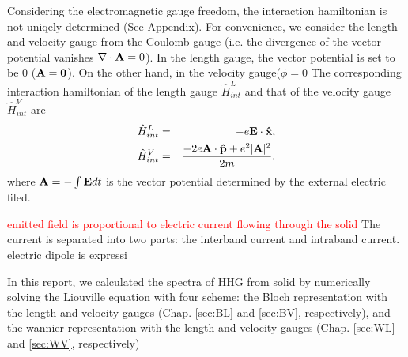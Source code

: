\documentclass[aps,prb,preprint]{revtex4-1}
\begin{document}
Considering the electromagnetic gauge freedom, the interaction hamiltonian is not uniqely determined (See Appendix). For convenience, we consider the length and velocity gauge from the Coulomb gauge (i.e. the divergence of the vector potential vanishes $\nabla \cdot {\bf A} = 0$). In the length gauge, the vector potential is set to be 0 (${\bf A} = {\bf 0}$). On the other hand, in the velocity gauge($\phi = 0$
The corresponding interaction hamiltonian of the length gauge  $\hat{H}^{L}_{int}$ and that of the velocity gauge $\hat{H}^{V}_{int}$ are 
 \begin{eqnarray}
 \hat{H}^{L}_{int} &=&  -e{\bf E} \cdot {\bf \hat{x}}, \\
 \hat{H}^{V}_{int} &=& \frac{- 2e{\bf A} \cdot {\bf \hat{p}} + e^2 |{\bf A}|^2}{2m}. 
\end{eqnarray}
where ${\bf A} = - \int {\bf E} dt$ is the vector potential determined by the external electric filed. 

\textcolor{red}{emitted field is proportional to electric current flowing through the solid}
The current is separated into two parts: the interband current and intraband current.\cite{Foldi}
electric dipole is expressi

In this report, we calculated the spectra of HHG from solid by numerically solving the Liouville equation with four scheme: the Bloch representation with the length and velocity gauges (Chap. \ref{sec:BL} and \ref{sec:BV}, respectively), and the wannier representation with the length and velocity gauges (Chap. \ref{sec:WL} and \ref{sec:WV}, respectively)
\end{document}

